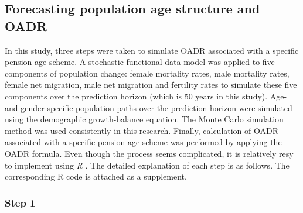 \documentclass[11pt,a4paper,]{article}
\begin{document}
\hypertarget{sec:forecasting}{%
\subsection{Forecasting population age structure and OADR}\label{sec:forecasting}}

In this study, three steps were taken to simulate OADR associated with a specific pension age scheme. A stochastic functional data model was applied to five components of population change: female mortality rates, male mortality rates, female net migration, male net migration and fertility rates to simulate these five components over the prediction horizon (which is 50 years in this study). Age- and gender-specific population paths over the prediction horizon were simulated using the demographic growth-balance equation. The Monte Carlo simulation method was used consistently in this research. Finally, calculation of OADR associated with a specific pension age scheme was performed by applying the OADR formula. Even though the process seems complicated, it is relatively resy to implement using \textit{R} \autocite{Team18}. The detailed explanation of each step is as follows. The corresponding R code is attached as a supplement.

\hypertarget{step-1}{%
\subsubsection*{Step 1}\label{step-1}}
\end{document}
